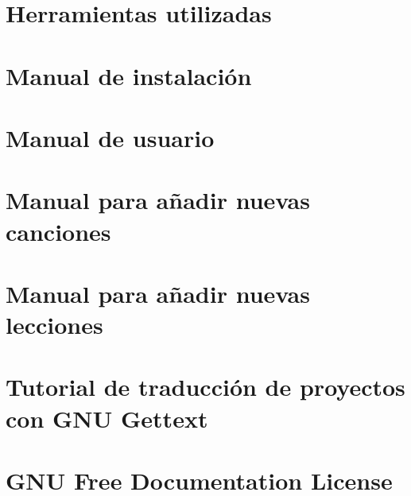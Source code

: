 \documentclass[a4paper,12pt]{scrbook}
\begin{document}
\appendix

\chapter{Herramientas utilizadas}
\label{chap:herramientas}


\chapter{Manual de instalación}
\label{chap:manual_instalacion}


\chapter{Manual de usuario}
\label{chap:manual_usuario}


\chapter{Manual para añadir nuevas canciones}
\label{chap:manual_canciones}


\chapter{Manual para añadir nuevas lecciones}
\label{chap:manual_lecciones}


\chapter{Tutorial de traducción de proyectos con GNU Gettext}
\label{chap:tutorial_gettext}


\chapter{GNU Free Documentation License}
\label{sec:fdl}





\printindex
\end{document}
